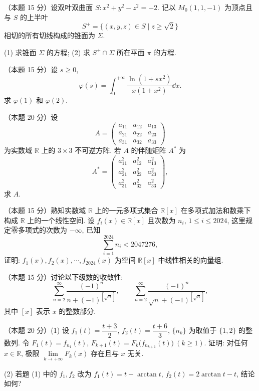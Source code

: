 
\begin{problems}

\item[一、]（本题 15 分）设双叶双曲面 $S: x^2+y^2-z^2=-2$. 记以 $M_0(1,1,-1)$ 为顶点且与 $S$ 的上半叶
\[
  S^+ = \{(x,y,z)\in S \mid z\ge\sqrt{2}\}
\]
相切的所有切线构成的锥面为 $\Sigma$.

(1) 求锥面 $\Sigma$ 的方程; \qquad (2) 求 $S^+\cap\Sigma$ 所在平面 $\pi$ 的方程.

\item[二、]（本题 15 分）设 $s\ge 0$,
\[
  \varphi(s)=\int_0^{+\infty}\frac{\ln(1+sx^2)}{x(1+x^2)}\dd x.
\]
求 $\varphi(1)$ 和 $\varphi(2)$.

\item[三、]（本题 20 分）设
\[
  A=\begin{pmatrix}
    a_{11} & a_{12} & a_{13}\\
    a_{21} & a_{22} & a_{23}\\
    a_{31} & a_{32} & a_{33}
  \end{pmatrix}
\]
为实数域 $\mathbb{R}$ 上的 $3\times 3$ 不可逆方阵. 若 $A$ 的伴随矩阵 $A^*$ 为
\[
  A^*=\begin{pmatrix}
    a_{11}^2 & a_{12}^2 & a_{13}^2\\
    a_{21}^2 & a_{22}^2 & a_{23}^2\\
    a_{31}^2 & a_{32}^2 & a_{33}^2
  \end{pmatrix},
\]
求 $A$.

\item[四、]（本题 15 分）熟知实数域 $\mathbb{R}$ 上的一元多项式集合 $\mathbb{R}[x]$ 在多项式加法和数乘下构成 $\mathbb{R}$ 上的一个线性空间. 设 $f_i(x)\in\mathbb{R}[x]$ 且次数为 $n_i$, $1\le i\le 2024$, 这里规定零多项式的次数为 $-\infty$, 已知
\[
  \sum_{i=1}^{2024} n_i < 2047276,
\]
证明: $f_1(x),f_2(x),\cdots,f_{2024}(x)$ 为空间 $\mathbb{R}[x]$ 中线性相关的向量组.

\item[五、]（本题 15 分）讨论以下级数的收敛性:
\[
  \sum_{n=2}^{\infty}\frac{(-1)^n}{n+(-1)^{[\sqrt{n}]}},
  \qquad
  \sum_{n=2}^{\infty}\frac{(-1)^n}{\sqrt{n}+(-1)^{[\sqrt{n}]}},
\]
其中 $[x]$ 表示 $x$ 的整数部分.

\item[六、]（本题 20 分）(1) 设 $f_1(t)=\dfrac{t+3}{2}$, $f_2(t)=\dfrac{t+6}{3}$, $\{n_k\}$ 为取值于 $\{1,2\}$ 的整数列. 令 $F_1(t)=f_{n_1}(t)$, $F_{k+1}(t)=F_k\bigl(f_{n_{k+1}}(t)\bigr)\ (k\ge 1)$. 证明: 对任何 $x\in\mathbb{R}$, 极限 $\lim\limits_{k\to+\infty}F_k(x)$ 存在且与 $x$ 无关.

(2) 若题 (1) 中的 $f_1,f_2$ 改为 $f_1(t)=t-\arctan t$, $f_2(t)=2\arctan t-t$, 结论如何?

\end{problems}
